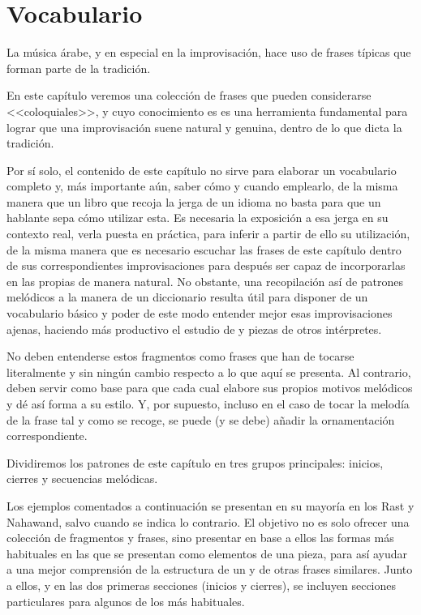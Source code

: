 \chapter{Vocabulario}

\label{vocabulario}


La música árabe, y en especial en la improvisación, hace uso de frases típicas que forman parte de la tradición.

En este capítulo veremos una colección de frases que pueden considerarse <<coloquiales>>, y cuyo conocimiento es es una herramienta fundamental para lograr que una improvisación suene natural y genuina, dentro de lo que dicta la tradición.

Por sí solo, el contenido de este capítulo no sirve para elaborar un vocabulario completo y, más importante aún, saber cómo y cuando emplearlo, de la misma manera que un libro que recoja la jerga de un idioma no basta para que un hablante sepa cómo utilizar esta. Es necesaria la exposición a esa jerga en su contexto real, verla puesta en práctica, para inferir a partir de ello su utilización, de la misma manera que es necesario escuchar las frases de este capítulo dentro de sus correspondientes improvisaciones para después ser capaz de incorporarlas en las propias de manera natural. No obstante, una recopilación así de patrones melódicos a la manera de un diccionario resulta útil para disponer de un vocabulario básico y poder de este modo entender mejor esas improvisaciones ajenas, haciendo más productivo el estudio de \taqasim y piezas de otros intérpretes.

No deben entenderse estos fragmentos como frases que han de tocarse literalmente y sin ningún cambio respecto a lo que aquí se presenta. Al contrario, deben servir como base para que cada cual elabore sus propios motivos melódicos y dé así forma a su estilo. Y, por supuesto, incluso en el caso de tocar la melodía de la frase tal y como se recoge, se puede (y se debe) añadir la ornamentación correspondiente.

Dividiremos los patrones de este capítulo en tres grupos principales: inicios, cierres y secuencias melódicas.

Los ejemplos comentados a continuación se presentan en su  mayoría en los \maqamaat Rast y Nahawand, salvo cuando se indica lo contrario. El objetivo no es solo ofrecer una colección de fragmentos y frases, sino presentar en base a ellos las formas más habituales en las que se presentan como elementos de una pieza, para así ayudar a una mejor comprensión de la estructura de un \taqsim y de otras frases similares. Junto a ellos, y en las dos primeras secciones (inicios y cierres), se incluyen secciones particulares para algunos de los \maqamaat más habituales.

